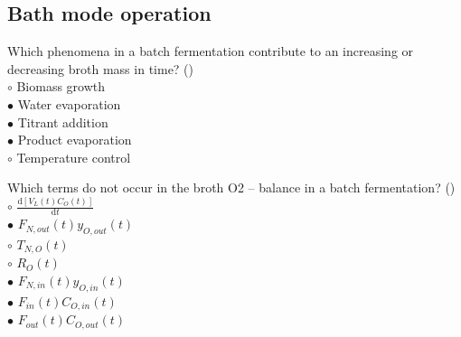 \documentclass[]{beamer}
\begin{document}
\begin{comment}
\begin{frame}[shrink] {}
  A second experiment is performed to test if product inhibition affects this fermentation. In this experiment, product was added to the feed ($C_{P,in} = 1000 mol/m^3$) to increase the product concentration in the fermenter. It was found that $C_{P,out2} =C_p  1833 mol P/m^3$ in this experiment. All the other values have stayed the same as in the previous fermentation. \\[0.3em]
Calculate the $q_{P2}$ \\ 
{\color{red}$\bullet$} $q_{P2}=0.0239(molP/h)/(molX)$ \\[0.5em] 
Compare the value of $q_{P2}$ with the value of $q_{P}$ found in question 8A. Based on these results, is there product inhibition? \\
{\color{red}$\bullet$} No \\ 
\end{frame}

\end{comment}

\subsection{Bath mode operation}
\setcounter{questions}{0}
\begin{frame}[shrink] {}
\addtocounter{questions}{1}
\color{blue}
Which phenomena in a batch fermentation contribute to an increasing or decreasing broth mass in time? ()\\
\color{black}
\setlength{\parindent}{-0.4cm}
{\color{red}$\circ$}  Biomass growth \\
{\color{red}$\bullet$} Water evaporation \\
{\color{red}$\bullet$} Titrant addition \\
{\color{red}$\bullet$} Product evaporation \\
{\color{red}$\circ$} Temperature control  \\
\end{frame}

\begin{frame}[shrink] {}
\addtocounter{questions}{1}
\color{blue}
Which terms do not occur in the broth O2 – balance in a batch fermentation? ()\\
\color{black}
\setlength{\parindent}{-0.4cm}
{\color{red}$\circ$} $\frac{\mathrm d [V_{L}(t)C_O(t)]}{\mathrm dt}$ \\[0.3em]
{\color{red}$\bullet$} $F_{N,out}(t) y_{O,out}(t)$ \\
{\color{red}$\circ$} $T_{N,O} (t)$ \\
{\color{red}$\circ$} $R_O (t)$ \\
{\color{red}$\bullet$} $F_{N,in}(t) y_{O,in}(t)$ \\
{\color{red}$\bullet$} $F_{in}(t) C_{O,in}(t)$ \\
{\color{red}$\bullet$} $F_{out}(t) C_{O,out}(t)$ \\
\end{frame}
\end{document}
